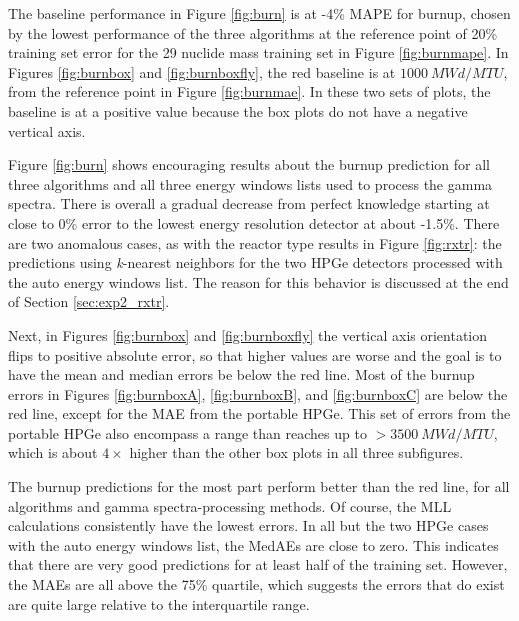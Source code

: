 The baseline performance in Figure \ref{fig:burn} is at -4\% \gls{MAPE} for
burnup, chosen by the lowest performance of the three algorithms at the
reference point of 20\% training set error for the 29 nuclide mass training set
in Figure \ref{fig:burnmape}. In Figures \ref{fig:burnbox} and
\ref{fig:burnboxfly}, the red baseline is at $1000\:MWd/MTU$, from the
reference point in Figure \ref{fig:burnmae}.  In these two sets of plots, the
baseline is at a positive value because the box plots do not have a negative
vertical axis. 

Figure \ref{fig:burn} shows encouraging results about the burnup prediction
for all three algorithms and all three energy windows lists used to process the
gamma spectra. There is overall a gradual decrease from perfect knowledge
starting at close to 0\% error to the lowest energy resolution detector at
about -1.5\%.  There are two anomalous cases, as with the reactor type results
in Figure \ref{fig:rxtr}: the predictions using \textit{k}-nearest neighbors
for the two \gls{HPGe} detectors processed with the auto energy windows list.
The reason for this behavior is discussed at the end of Section
\ref{sec:exp2_rxtr}.  

Next, in Figures \ref{fig:burnbox} and \ref{fig:burnboxfly} the vertical axis
orientation flips to positive absolute error, so that higher values are worse
and the goal is to have the mean and median errors be below the red line.  Most
of the burnup errors in Figures \ref{fig:burnboxA}, \ref{fig:burnboxB}, and
\ref{fig:burnboxC} are below the red line, except for the \gls{MAE} from the
portable \gls{HPGe}. This set of errors from the portable \gls{HPGe} also
encompass a range than reaches up to $>3500\:MWd/MTU$, which is about $4\times$
higher than the other box plots in all three subfigures. 

The burnup predictions for the most part perform better than the red line, for
all algorithms and gamma spectra-processing methods.  Of course, the \gls{MLL}
calculations consistently have the lowest errors. In all but the two \gls{HPGe}
cases with the auto energy windows list, the \gls{MedAE}s are close to zero.
This indicates that there are very good predictions for at least half of the
training set.  However, the \gls{MAE}s are all above the 75\% quartile, which
suggests the errors that do exist are quite large relative to the interquartile
range. 

